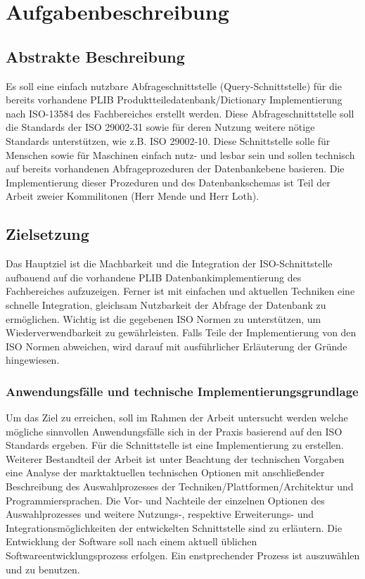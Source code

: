 \chapter{Aufgabenbeschreibung} \label{Aufgabenbeschreibung}

\section{Abstrakte Beschreibung}

Es soll eine einfach nutzbare Abfrageschnittstelle (Query-Schnittstelle) für die bereits vorhandene PLIB Produktteiledatenbank/Dictionary Implementierung nach ISO-13584 des Fachbereiches erstellt werden. Diese Abfrageschnittstelle soll die Standards der ISO 29002-31 sowie für deren Nutzung weitere nötige Standards unterstützen, wie z.B. ISO 29002-10. Diese Schnittstelle solle für Menschen sowie für Maschinen einfach nutz- und lesbar sein und sollen technisch auf bereits vorhandenen Abfrageprozeduren der Datenbankebene basieren. Die Implementierung dieser Prozeduren und des Datenbankschemas ist Teil der Arbeit zweier Kommilitonen (Herr Mende und Herr Loth).

\section{Zielsetzung}

Das Hauptziel ist die Machbarkeit und die Integration der ISO-Schnittstelle aufbauend auf die vorhandene PLIB Datenbankimplementierung des Fachbereiches aufzuzeigen. 
Ferner ist mit einfachen und aktuellen Techniken eine schnelle Integration, gleichsam Nutzbarkeit der Abfrage der Datenbank zu ermöglichen. Wichtig ist die gegebenen ISO Normen zu unterstützen, um Wiederverwendbarkeit zu gewährleisten. Falls Teile der Implementierung von den ISO Normen abweichen, wird darauf mit ausführlicher Erläuterung der Gründe hingewiesen. 

\subsection{Anwendungsfälle und technische Implementierungsgrundlage}

Um das Ziel zu erreichen, soll im Rahmen der Arbeit untersucht werden welche mögliche sinnvollen Anwendungsfälle sich in der Praxis basierend auf den ISO Standards ergeben. Für die Schnittstelle ist eine Implementierung zu erstellen. Weiterer Bestandteil der Arbeit ist unter Beachtung der technischen Vorgaben eine Analyse der marktaktuellen technischen Optionen mit anschließender Beschreibung des Auswahlprozesses der Techniken/Plattformen/Architektur und Programmiersprachen. Die Vor- und Nachteile der einzelnen Optionen des Auswahlprozesses und weitere Nutzungs-, respektive Erweiterungs- und Integrationsmöglichkeiten der entwickelten Schnittstelle sind zu erläutern. 
Die Entwicklung der Software soll nach einem aktuell üblichen Softwareentwicklungsprozess erfolgen. Ein enstprechender Prozess ist auszuwählen und zu benutzen. 

